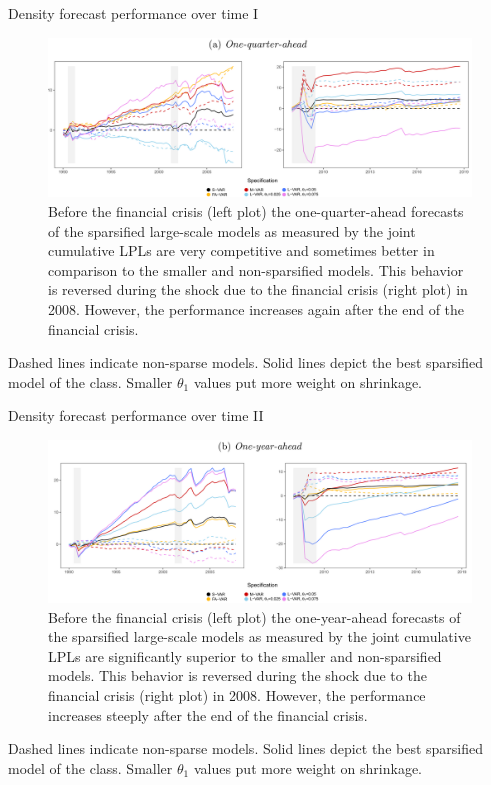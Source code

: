 \begin{frame}{Density forecast performance over time I}
    \begin{figure}
        \centering
        \includegraphics[width=\textwidth]{plots/lpl_one_quarter_ahead.png}
        \caption{Before the financial crisis (left plot) the one-quarter-ahead forecasts of the sparsified large-scale models as measured by the joint cumulative LPLs are very competitive and sometimes better in comparison to the smaller and non-sparsified models. This behavior is reversed during the shock due to the financial crisis (right plot) in 2008. However, the performance increases again after the end of the financial crisis.}
        \label{fig:lpl_one_quarter_ahead}
    \end{figure}
    
    \scriptsize Dashed lines indicate non-sparse models. Solid lines depict the best sparsified model of the class. Smaller $\theta_1$ values put more weight on shrinkage.
\end{frame}

\begin{frame}{Density forecast performance over time II}
    \begin{figure}
        \centering
        \includegraphics[width=\textwidth]{plots/lpl_one_year_ahead.png}
        \caption{Before the financial crisis (left plot) the one-year-ahead forecasts of the sparsified large-scale models as measured by the joint cumulative LPLs are significantly superior to the smaller and non-sparsified models. This behavior is reversed during the shock due to the financial crisis (right plot) in 2008. However, the performance increases steeply after the end of the financial crisis.}
        \label{fig:lpl_one_year_ahead}
    \end{figure}
    
    \scriptsize Dashed lines indicate non-sparse models. Solid lines depict the best sparsified model of the class. Smaller $\theta_1$ values put more weight on shrinkage.
\end{frame}

